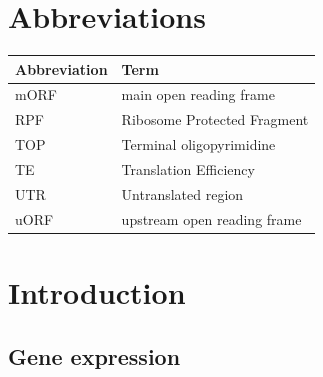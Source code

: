 \documentclass[
  12pt,
  openany]{book}
\author{}
\date{\vspace{-2.5em}}
\begin{document}
{
\setcounter{tocdepth}{4}
\tableofcontents
}
\cleardoublepage
\pagestyle{fancy}
\fancyhf{}
\renewcommand{\headrulewidth}{0pt}
\fancyfoot[LE,RO]{\thepage}
\renewcommand{\floatpagefraction}{.9}

\setcounter{page}{9}

\hypertarget{abbreviations}{%
\chapter*{Abbreviations}\label{abbreviations}}

\begin{tabular}{ll}
\toprule
Abbreviation & Term\\
\midrule
mORF & main open reading frame\\
RPF & Ribosome Protected Fragment\\
TOP & Terminal oligopyrimidine\\
TE & Translation Efficiency\\
UTR & Untranslated region\\
uORF & upstream open reading frame\\
\bottomrule
\end{tabular}

\chapter{Introduction}

\section{Gene expression}
\end{document}
